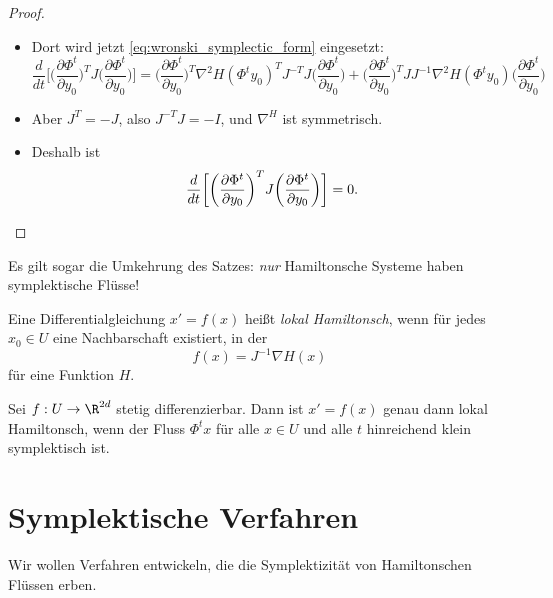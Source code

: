 \begin{proof}
\begin{itemize}
   \item Dort wird jetzt \eqref{eq:wronski_symplectic_form} eingesetzt:
    \begin{equation*}
      \frac{d}{dt}\bigg[ \bigg(\frac{\partial \Phi^t}{\partial y_0}\bigg)^T J \bigg(\frac{\partial \Phi^t}{\partial y_0}\bigg) \bigg]
      =
      \bigg(\frac{\partial \Phi^t}{\partial y_0}\bigg)^T \nabla^2 H(\Phi^t y_0)^T J^{-T} J \bigg(\frac{\partial \Phi^t}{\partial y_0}\bigg)
      + \bigg(\frac{\partial \Phi^t}{\partial y_0}\bigg)^T J J^{-1} \nabla^2 H(\Phi^t y_0) \bigg(\frac{\partial \Phi^t}{\partial y_0}\bigg)
    \end{equation*}
  \item Aber $J^T = -J$, also $J^{-T} J = -I$, und $\nabla^ H$ ist symmetrisch.
  \item Deshalb ist
    \begin{equation*}
      \frac{d}{dt}\bigg[ \bigg(\frac{\partial \Phi^t}{\partial y_0}\bigg)^T
        J
        \bigg(\frac{\partial \Phi^t}{\partial y_0}\bigg) \bigg]
      = 0.
      \qedhere
    \end{equation*}
  \end{itemize}
\end{proof}

Es gilt sogar die Umkehrung des Satzes:
\emph{nur} Hamiltonsche Systeme haben symplektische Flüsse!

\begin{definition}
  Eine Differentialgleichung $x' = f(x)$ heißt \emph{lokal Hamiltonsch}, wenn für jedes $x_0 \in U$ eine Nachbarschaft existiert, in der
  \begin{equation*}
    f(x) = J^{-1} \nabla H(x)
  \end{equation*}
  für eine Funktion $H$.
\end{definition}

\begin{satz}
  Sei $f: U \to \R^{2d}$ stetig differenzierbar.
  Dann ist $x' = f(x)$ genau dann lokal Hamiltonsch, wenn der Fluss $\Phi^t x$ für alle $x \in U$ und alle $t$ hinreichend klein symplektisch ist.
\end{satz}

\section{Symplektische Verfahren}

Wir wollen Verfahren entwickeln, die die Symplektizität von Hamiltonschen Flüssen erben.

